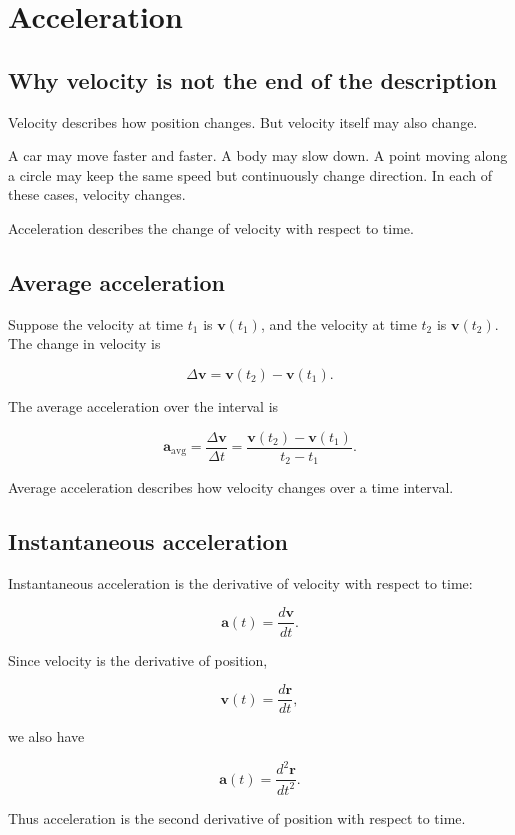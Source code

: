 \section{Acceleration}

\subsection{Why velocity is not the end of the description}

Velocity describes how position changes. But velocity itself may also change.

A car may move faster and faster. A body may slow down. A point moving along a circle may keep the same speed but continuously change direction. In each of these cases, velocity changes.

Acceleration describes the change of velocity with respect to time.

\subsection{Average acceleration}

Suppose the velocity at time \(t_1\) is \(\mathbf{v}(t_1)\), and the velocity at time \(t_2\) is \(\mathbf{v}(t_2)\). The change in velocity is

\[
\Delta \mathbf{v}
=
\mathbf{v}(t_2)-\mathbf{v}(t_1).
\]

The average acceleration over the interval is

\[
\mathbf{a}_{\mathrm{avg}}
=
\frac{\Delta \mathbf{v}}{\Delta t}
=
\frac{\mathbf{v}(t_2)-\mathbf{v}(t_1)}{t_2-t_1}.
\]

Average acceleration describes how velocity changes over a time interval.

\subsection{Instantaneous acceleration}

Instantaneous acceleration is the derivative of velocity with respect to time:

\[
\mathbf{a}(t)
=
\frac{d\mathbf{v}}{dt}.
\]

Since velocity is the derivative of position,

\[
\mathbf{v}(t)=\frac{d\mathbf{r}}{dt},
\]

we also have

\[
\mathbf{a}(t)
=
\frac{d^2\mathbf{r}}{dt^2}.
\]

Thus acceleration is the second derivative of position with respect to time.

